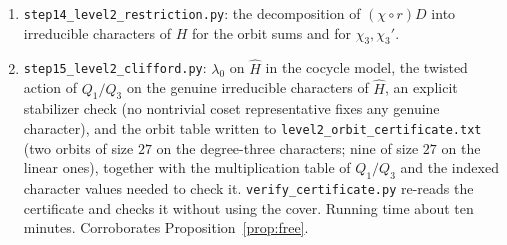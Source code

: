 \documentclass[11pt]{article}
\newcommand{\Irr}{\operatorname{Irr}}
\newcommand{\Ad}{\operatorname{Ad}}
\theoremstyle{plain}
\theoremstyle{definition}
\begin{document}
\begin{enumerate}[label=\arabic*.]
$H=Q_3/Q_7$ (multiplication table, $297$ classes), its character table
by Burnside's algorithm with exact re-verification, the $\Ad(Q_1)$-orbits
on $\Irr(H)$, the $219$ good classes and the cube root; the criterion
of Proposition~\ref{prop:criterion} tested by exact integer linear
algebra (Smith normal form) for the four $D_8$-orbit sums of
$\Irr(\mathrm{Heis})$.
\item \texttt{step14\_level2\_restriction.py}: the decomposition of
$(\chi\circ r)D$ into irreducible characters of $H$ for the orbit sums
and for $\chi_3,\chi_3'$.
\item \texttt{step15\_level2\_clifford.py}: $\lambda_0$ on $\hat H$ in
the cocycle model, the twisted action of $Q_1/Q_3$ on the genuine
irreducible characters of $\hat H$, an explicit stabilizer check (no
nontrivial coset representative fixes any genuine character), and the
orbit table written to \texttt{level2\_orbit\_certificate.txt} (two
orbits of size $27$ on the degree-three characters; nine of size $27$
on the linear ones), together with the multiplication table of
$Q_1/Q_3$ and the indexed character values needed to check it.
\texttt{verify\_certificate.py} re-reads the certificate and checks it
without using the cover.  Running time about ten minutes.  Corroborates
Proposition~\ref{prop:free}.
\end{enumerate}
\end{document}
